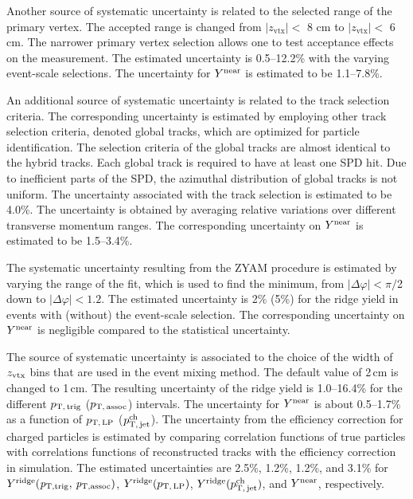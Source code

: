 Another source of systematic uncertainty is related to the selected range of the primary vertex. The accepted range is changed from $|z_\mathrm{vtx}|<$ 8 cm to $|z_\mathrm{vtx}|<$ 6 cm. The narrower primary vertex selection allows one to test acceptance effects on the measurement. The estimated uncertainty is 0.5--12.2\% with the varying event-scale selections. The uncertainty for $Y^{\rm{near}}$ is estimated to be 1.1--7.8\%.

An additional source of systematic uncertainty is related to the track selection criteria. The corresponding uncertainty is estimated by employing other track selection criteria, denoted global tracks, which are optimized for particle identification. The selection criteria of the global tracks are almost identical to the hybrid tracks. Each global track is required to have at least one SPD hit. 
Due to inefficient parts of the SPD, the azimuthal distribution of global tracks is not uniform.
The uncertainty associated with the track selection is estimated to be 4.0\%. The uncertainty is obtained by averaging relative variations over different transverse momentum ranges. The corresponding uncertainty on $Y^{\rm{near}}$ is estimated to be 1.5--3.4\%.

The systematic uncertainty resulting from the ZYAM procedure is estimated by varying the range of the fit, which is used to find the minimum, from $|\Delta\varphi|<\pi/$2 down to $|\Delta\varphi|<1.2$. The estimated uncertainty is 2\% (5\%) for the ridge yield in events with (without) the event-scale selection. The corresponding uncertainty on $Y^{\rm{near}}$ is negligible compared to the statistical uncertainty.

The source of systematic uncertainty is associated to the choice of the width of $z_{\rm vtx}$ bins that are used in the event mixing method. The default value of 2\,cm is changed to 1\,cm. The resulting uncertainty of the ridge yield is 1.0--16.4\% for the different $p_\mathrm{T,\,trig}$ ($p_\mathrm{T,\,assoc}$) intervals.
The uncertainty for $Y^{\rm{near}}$ is about 0.5--1.7\% as a function of $p_\mathrm{T,\,LP}$ ($p_\mathrm{T,\,jet}^\mathrm{ch}$). The uncertainty from the efficiency correction for charged particles is estimated by comparing correlation functions of true particles with correlations functions of reconstructed tracks with the efficiency correction in simulation. The estimated uncertainties are 2.5\%, 1.2\%, 1.2\%, and 3.1\% for $Y^{\rm{ridge}}(\it{p}_{\rm{T, trig}},\,\it{p}_{\rm{T, assoc}})$,  $Y^{\rm{ridge}}(p_\mathrm{T,\,LP})$, $Y^{\rm{ridge}}(p_\mathrm{T,\,jet}^\mathrm{ch})$, and $Y^{\rm{near}}$, respectively. 

